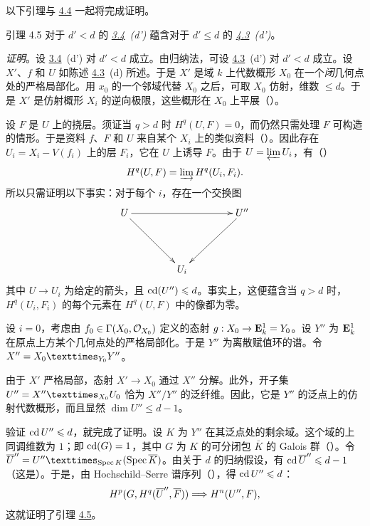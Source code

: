 以下引理与 \hyperref[XIV.lem4.4]{4.4} 一起将完成证明。

\begin{enonce*}{引理 4.5}
对于 $d'<d$ 的 \emph{\hyperref[XIV.cor3.4]{3.4}~(d')} 蕴含对于 $d'\leq d$ 的 \emph{\hyperref[XIV.enon4.3]{4.3}~(d')}。
\end{enonce*}

\noindent
\emph{证明}。设 \hyperref[XIV.cor3.4]{3.4}~(d') 对 $d'<d$ 成立。由归纳法，可设 \hyperref[XIV.enon4.3]{4.3}~(d') 对 $d'<d$ 成立。设 $X'$、$f$ 和 $U$ 如陈述 \hyperref[XIV.enon4.3]{4.3}~(d) 所述。于是 $X'$ 是域 $k$ 上代数概形 $X_0$ 在一个\emph{闭}几何点处的严格局部化。用 $x_0$ 的一个邻域代替 $X_0$ 之后，可取 $X_0$ 仿射，维数 $\leq d$。于是 $X'$ 是仿射概形 $X_i$ 的逆向极限，这些概形在 $X_0$ 上平展（）。

设 $F$ 是 $U$ 上的挠层。须证当 $q>d$ 时 $H^q(U,F)=0$，而仍然只需处理 $F$ 可构造的情形。于是资料 $f$、$F$ 和 $U$ 来自某个 $X_i$ 上的类似资料（）。因此存在 $U_i=X_i-V(f_i)$ 上的层 $F_i$，它在 $U$ 上诱导 $F$。由于 $U=\varprojlim U_i$，有（）
$$
H^q(U,F)=\varinjlim H^q(U_i,F_i){\quoi}.
$$
所以只需证明以下事实：对于每个 $i$，存在一个交换图
$$
\xymatrix@=1.5cm{
 U \ar[rr] \ar[rd]&        & U''\ar[ld]\\
   &  U_i   &
}
$$
其中 $U\rightarrow U_i$ 为给定的箭头，且 $\cd(U'')\sisi{<}{\leq}d$。事实上，这便蕴含\pageoriginale 当 $q>d$ 时，$H^q(U_i,F_i)$ 的每个元素在 $H^q(U,F)$ 中的像都为零。

设 $i=0$，考虑由 $f_0\in\Gamma(X_0,\Oo_{X_0})$ 定义的态射 $g:X_0\rightarrow\EE^1_k=Y_0$。设 $Y''$ 为 $\EE^1_k$ 在原点上方某个几何点处的严格局部化。于是 $Y''$ 为离散赋值环的谱。令 $X''=\fprod{X_0}{Y''}{Y_0}$。

由于 $X'$ 严格局部，态射 $X'\rightarrow X_0$ 通过 $X''$ 分解。此外，开子集 $U''=\fprod{X''}{U_0}{X_0}$ 恰为 $X''/Y''$ 的泛纤维。因此，它是 $Y''$ 的泛点上的仿射代数概形，而且显然 $\dim U''\leq d-1$。

验证 $\cd U''\leq d$，就完成了证明。设 $K$ 为 $Y''$ 在其泛点处的剩余域。这个域的上同调维数为 $1$；即 $\cd(G)=1$，其中 $G$ 为 $K$ 的可分闭包 $\bar K$ 的 Galois 群（）。令 $\bar U''=\fprod{U''}{(\Spec\bar K)}{\Spec K}$。由关于 $d$ 的归纳假设，有 $\cd\bar U''\leq d-1$（这是）。于是，由 Hochschild--Serre 谱序列（），得 $\cd U''\leq d$：
$$
H^p(G,H^q(\bar U\sisi{'}{''},\bar F))\Longrightarrow H^n(U'',F){\quoi},
$$
这就证明了引理 \hyperref[XIV.lem4.5]{4.5}。
